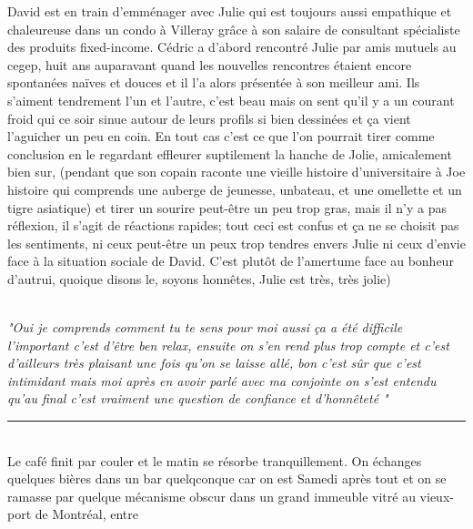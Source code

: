 \begin{paracol}{2}
    \begin{rightcolumn}
David est en train d'emménager avec Julie qui est toujours aussi
empathique et chaleureuse dans un condo à Villeray grâce à son salaire 
de consultant spécialiste des produits fixed-income. Cédric a
d'abord rencontré Julie par amis mutuels au cegep, huit ans auparavant
quand les nouvelles rencontres étaient encore spontanées naïves et douces et il
l'a alors présentée à son meilleur ami. Ils s'aiment tendrement l'un et l'autre, c'est beau
mais on sent qu'il y a un courant froid qui ce soir sinue autour de leurs profils si
bien dessinées et ça vient l'aguicher un peu en coin.
En tout cas c'est ce que l'on pourrait tirer comme conclusion en le
regardant effleurer suptilement la hanche de Jolie, amicalement bien sur, 
(pendant que son copain raconte une vieille histoire d'universitaire à Joe
histoire qui comprends une auberge de jeunesse, unbateau, et une omellette et un tigre asiatique)
et tirer un sourire peut-être un peu trop gras, mais il n'y a pas réflexion, il
s'agit de réactions rapides; tout ceci est confus et ça ne se choisit pas les
sentiments, ni ceux peut-être un peux trop tendres envers Julie ni ceux d'envie
face à la situation sociale de David. C'est plutôt de l'amertume face au
bonheur d'autrui, quoique disons le, soyons honnêtes, Julie est très, très
jolie) \\
\end{rightcolumn}
\begin{leftcolumn}
    \phantom\\\vspace{5em}
    \textit{"Oui je comprends comment tu te sens pour moi aussi ça a été difficile
    l'important c'est d'être ben relax, ensuite on s'en rend
plus trop compte et c'est d'ailleurs très plaisant une fois qu'on se laisse allé,
bon c'est sûr que c'est intimidant mais moi après en avoir parlé avec ma conjointe
on s'est entendu qu'au final c'est vraiment une question de confiance et d'honnêteté
\textelp{}"}
\end{leftcolumn}
\end{paracol}
\begin{center}\noindent\rule{0.5\textwidth}{0.4pt}\end{center}\\
Le café finit par couler et le matin se résorbe tranquillement. On échanges quelques bières dans un
bar quelqconque car on est Samedi après tout et on se ramasse par quelque
mécanisme obscur dans un grand immeuble vitré au vieux-port de Montréal, entre
